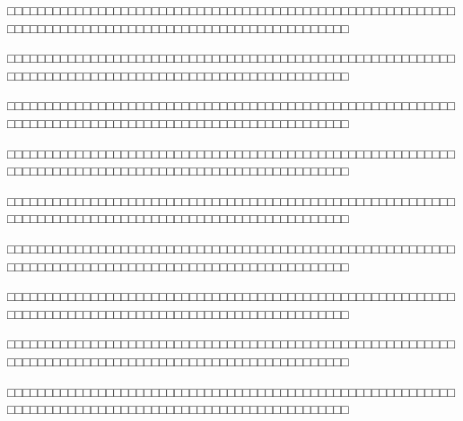 □□□□□□□□□□□□□□□□□□□□□□□□□□□□□□□□□□□□□□□□□□□□□□□□□□□□□□□□□□□□□□□□□□□□□□□□□□□□□□□□□□□□□□□□□□□□□□□□□□□□□□□□

□□□□□□□□□□□□□□□□□□□□□□□□□□□□□□□□□□□□□□□□□□□□□□□□□□□□□□□□□□□□□□□□□□□□□□□□□□□□□□□□□□□□□□□□□□□□□□□□□□□□□□□□

□□□□□□□□□□□□□□□□□□□□□□□□□□□□□□□□□□□□□□□□□□□□□□□□□□□□□□□□□□□□□□□□□□□□□□□□□□□□□□□□□□□□□□□□□□□□□□□□□□□□□□□□

□□□□□□□□□□□□□□□□□□□□□□□□□□□□□□□□□□□□□□□□□□□□□□□□□□□□□□□□□□□□□□□□□□□□□□□□□□□□□□□□□□□□□□□□□□□□□□□□□□□□□□□□

□□□□□□□□□□□□□□□□□□□□□□□□□□□□□□□□□□□□□□□□□□□□□□□□□□□□□□□□□□□□□□□□□□□□□□□□□□□□□□□□□□□□□□□□□□□□□□□□□□□□□□□□

□□□□□□□□□□□□□□□□□□□□□□□□□□□□□□□□□□□□□□□□□□□□□□□□□□□□□□□□□□□□□□□□□□□□□□□□□□□□□□□□□□□□□□□□□□□□□□□□□□□□□□□□

□□□□□□□□□□□□□□□□□□□□□□□□□□□□□□□□□□□□□□□□□□□□□□□□□□□□□□□□□□□□□□□□□□□□□□□□□□□□□□□□□□□□□□□□□□□□□□□□□□□□□□□□

□□□□□□□□□□□□□□□□□□□□□□□□□□□□□□□□□□□□□□□□□□□□□□□□□□□□□□□□□□□□□□□□□□□□□□□□□□□□□□□□□□□□□□□□□□□□□□□□□□□□□□□□

□□□□□□□□□□□□□□□□□□□□□□□□□□□□□□□□□□□□□□□□□□□□□□□□□□□□□□□□□□□□□□□□□□□□□□□□□□□□□□□□□□□□□□□□□□□□□□□□□□□□□□□□
